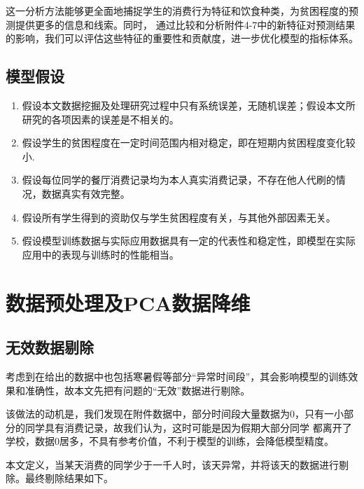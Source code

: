 \documentclass{article}
\begin{document}
这一分析方法能够更全面地捕捉学生的消费行为特征和饮食种类，为贫困程度的预测提供更多的信息和线索。同时，
通过比较和分析附件4-7中的新特征对预测结果的影响，我们可以评估这些特征的重要性和贡献度，进一步优化模型的指标体系。\cite{reference5,reference6}

\subsection{模型假设}

\begin{enumerate}
  \item 假设本文数据挖掘及处理研究过程中只有系统误差，无随机误差；假设本文所研究的各项因素的误差是不相关的。
  \item 假设学生的贫困程度在一定时间范围内相对稳定，即在短期内贫困程度变化较小.
  \item 假设每位同学的餐厅消费记录均为本人真实消费记录，不存在他人代刷的情况，数据真实有效完整。
  \item 假设所有学生得到的资助仅与学生贫困程度有关，与其他外部因素无关。
  \item 假设模型训练数据与实际应用数据具有一定的代表性和稳定性，即模型在实际应用中的表现与训练时的性能相当。
\end{enumerate}

\section{数据预处理及PCA数据降维}

\subsection{无效数据剔除}

考虑到在给出的数据中也包括寒暑假等部分“异常时间段”，其会影响模型的训练效果和准确性，故本文先把有问题的“无效”数据进行剔除。

该做法的动机是，我们发现在附件数据中，部分时间段大量数据为0，只有一小部分的同学具有消费记录，故我们认为，这时可能是因为假期大部分同学
都离开了学校，数据0居多，不具有参考价值，不利于模型的训练，会降低模型精度。

本文定义，当某天消费的同学少于一千人时，该天异常，并将该天的数据进行剔除。最终剔除结果如下。
\end{document}
